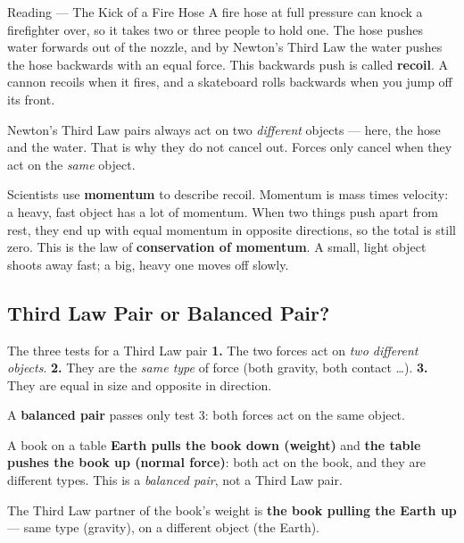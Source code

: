\begin{readingbox}{Reading --- The Kick of a Fire Hose}
A fire hose at full pressure can knock a firefighter over, so it takes two or three people to hold one. The hose pushes water forwards out of the nozzle, and by Newton's Third Law the water pushes the hose backwards with an equal force. This backwards push is called \textbf{recoil}. A cannon recoils when it fires, and a skateboard rolls backwards when you jump off its front.

Newton's Third Law pairs always act on two \emph{different} objects --- here, the hose and the water. That is why they do not cancel out. Forces only cancel when they act on the \emph{same} object.

Scientists use \textbf{momentum} to describe recoil. Momentum is mass times velocity: a heavy, fast object has a lot of momentum. When two things push apart from rest, they end up with equal momentum in opposite directions, so the total is still zero. This is the law of \textbf{conservation of momentum}. A small, light object shoots away fast; a big, heavy one moves off slowly.
\end{readingbox}

\rcreset
{}

\label{theory:3}

\subsection{Third Law Pair or Balanced Pair?}\label{sub:a3.1}

\begin{skillbox}{The three tests for a Third Law pair}
\textbf{1.} The two forces act on \emph{two different objects}. \quad \textbf{2.} They are the \emph{same type} of force (both gravity, both contact \dots). \quad \textbf{3.} They are equal in size and opposite in direction.

A \textbf{balanced pair} passes only test 3: both forces act on the same object.
\end{skillbox}

\begin{workedex}{A book on a table}
\textbf{Earth pulls the book down (weight)} and \textbf{the table pushes the book up (normal force)}: both act on the book, and they are different types. This is a \emph{balanced pair}, not a Third Law pair.

\smallskip
The Third Law partner of the book's weight is \textbf{the book pulling the Earth up} --- same type (gravity), on a different object (the Earth).
\end{workedex}

